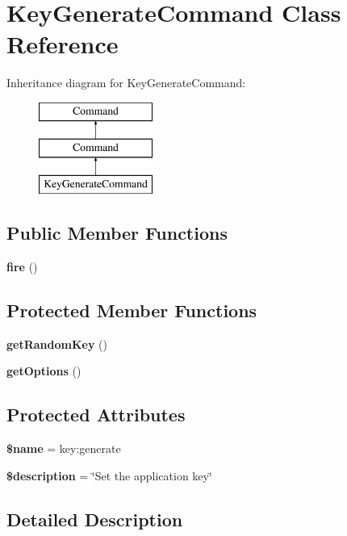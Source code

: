\section{Key\+Generate\+Command Class Reference}
\label{class_illuminate_1_1_foundation_1_1_console_1_1_key_generate_command}
Inheritance diagram for Key\+Generate\+Command\+:\begin{figure}[H]
\begin{center}
\leavevmode
\includegraphics[height=3.000000cm]{class_illuminate_1_1_foundation_1_1_console_1_1_key_generate_command}
\end{center}
\end{figure}
\subsection*{Public Member Functions}
\begin{DoxyCompactItemize}
\item 
{\bf fire} ()
\end{DoxyCompactItemize}
\subsection*{Protected Member Functions}
\begin{DoxyCompactItemize}
\item 
{\bf get\+Random\+Key} ()
\item 
{\bf get\+Options} ()
\end{DoxyCompactItemize}
\subsection*{Protected Attributes}
\begin{DoxyCompactItemize}
\item 
{\bf \$name} = \textquotesingle{}key\+:generate\textquotesingle{}
\item 
{\bf \$description} = \char`\"{}Set the application key\char`\"{}
\end{DoxyCompactItemize}


\subsection{Detailed Description}


